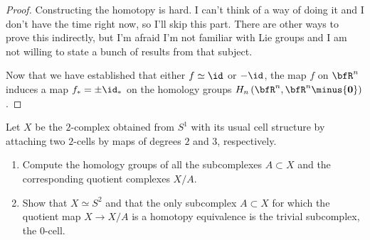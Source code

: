 \begin{proof}
Constructing the homotopy is hard. I can't think of a way of doing it and I
don't have the time right now, so I'll skip this part. There are other ways
to prove this indirectly, but I'm afraid I'm not familiar with Lie groups
and I am not willing to state a bunch of results from that subject.

Now that we have established that either $f\simeq \id$ or $-\id$, the map
$f$ on $\bfR^n$ induces a map $f_*=\pm\id_*$ on the homology groups
$H_n\left(\bfR^n,\bfR^n\minus\{\mathbf{0}\}\right)$.
\end{proof}
\newpage

\begin{problem}[Hatcher {\S}2.2, Ex.\@ 13]
Let $X$ be the $2$-complex obtained from $S^1$ with its usual cell
structure by attaching two $2$-cells by maps of degrees $2$ and $3$,
respectively.
\begin{enumerate}[label=(\alph*)]
\item Compute the homology groups of all the subcomplexes $A\subset X$ and
  the corresponding quotient complexes $X/A$.
\item Show that $X\simeq S^2$ and that the only subcomplex $A\subset X$ for
  which the quotient map $X\to X/A$ is a homotopy equivalence is the
  trivial subcomplex, the $0$-cell.
\end{enumerate}
\end{problem}
